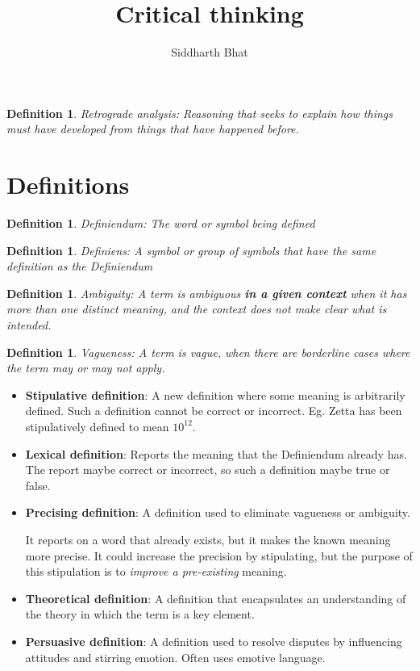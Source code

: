 \documentclass[11pt]{book}
\title{Critical thinking}
\author{Siddharth Bhat}
\date{}
\newtheorem{definition}[theorem]{Definition}
\begin{document}
\maketitle
\tableofcontents

\begin{definition}
    Retrograde analysis: Reasoning that seeks to explain how things
    must have developed from things that have happened before.
\end{definition}

\section{Definitions}
\begin{definition}
    Definiendum: The word or symbol being defined
\end{definition}

\begin{definition}
    Definiens: A symbol or group of symbols that have the same definition
    as the Definiendum
\end{definition}

\begin{definition}
    Ambiguity: A term is ambiguous \textbf{in a given context} when it
    has more than one distinct meaning, and the context does not make clear
    what is intended.
\end{definition}

\begin{definition}
    Vagueness: A term is vague, when there are borderline cases where the
    term may or may not apply.
\end{definition}

\begin{itemize}
    \item \textbf{Stipulative definition}: A new definition where some meaning is
        arbitrarily defined. Such a definition cannot be correct or incorrect.
        Eg. Zetta has been stipulatively defined to mean $10^{12}$.
    \item \textbf{Lexical definition}: Reports the meaning that the Definiendum
        already has. The report maybe correct or incorrect, so such a definition
        maybe true or false.
    \item \textbf{Precising definition}: A definition used to eliminate 
        vagueness or ambiguity.

        It reports on a word that already exists, but it makes the known
        meaning more precise. It could increase the precision by stipulating,
        but the purpose of this stipulation is to \textit{improve a pre-existing}
        meaning.

    \item \textbf{Theoretical definition}: A definition that encapsulates
        an understanding of the theory in which the term is a key element.
    \item \textbf{Persuasive definition}: A definition used to resolve
        disputes  by influencing attitudes and stirring emotion. Often
        uses emotive language.
\end{itemize}
\end{document}
